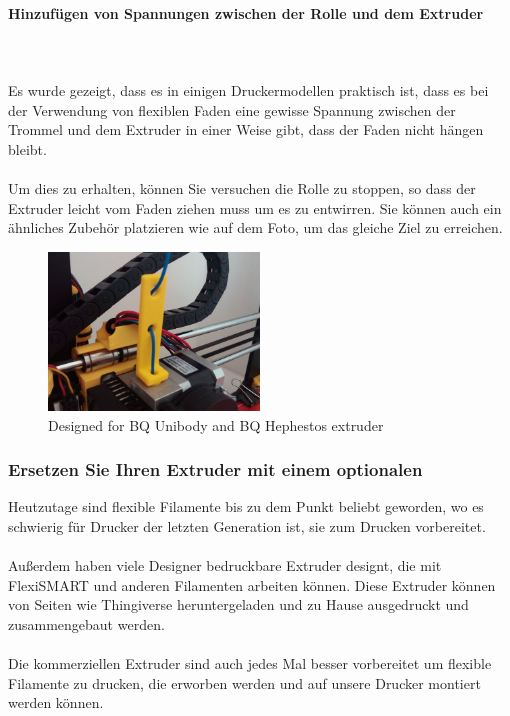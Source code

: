 \documentclass[11pt,a4paper]{article}
\begin{document}
			\paragraph{Hinzufügen von Spannungen zwischen der Rolle und dem Extruder}\mbox{}\\\\
Es wurde gezeigt, dass es in einigen Druckermodellen praktisch ist, dass es bei der Verwendung von flexiblen Faden eine gewisse Spannung zwischen der Trommel und dem Extruder in einer Weise gibt, dass der Faden nicht hängen bleibt.
\\\\
Um dies zu erhalten, können Sie versuchen die Rolle zu stoppen, so dass der Extruder leicht vom Faden ziehen muss um es zu entwirren. Sie können auch ein ähnliches Zubehör platzieren wie auf dem Foto, um das gleiche Ziel zu erreichen.
\begin{figure}[H]
\centering
\includegraphics[width=0.5\textwidth,cfbox=azul_marcos 4pt 0pt]{FOTOS/SOLUCION2}
\caption*{Designed for BQ Unibody and BQ Hephestos extruder}
\end{figure}
		\subsubsection{Ersetzen Sie Ihren Extruder mit einem optionalen}
Heutzutage sind flexible Filamente bis zu dem Punkt beliebt geworden, wo es schwierig für Drucker der letzten Generation ist, sie zum Drucken vorbereitet.
\\\\
Außerdem haben viele Designer bedruckbare Extruder designt, die mit FlexiSMART und anderen Filamenten arbeiten können. Diese Extruder können von Seiten wie Thingiverse heruntergeladen und zu Hause ausgedruckt und zusammengebaut werden.
\\\\
Die kommerziellen Extruder sind auch jedes Mal besser vorbereitet um flexible Filamente zu drucken, die erworben werden und auf unsere Drucker montiert werden können.
\end{document}
